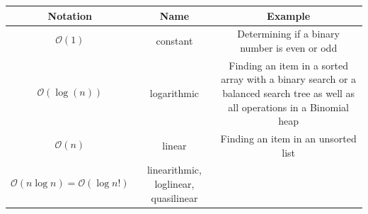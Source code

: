 \documentclass[11pt]{article}
\begin{document}
\begin{longtable}[]{@{}ccc@{}}
\toprule
\begin{minipage}[b]{0.30\columnwidth}\centering
Notation\strut
\end{minipage} & \begin{minipage}[b]{0.30\columnwidth}\centering
Name\strut
\end{minipage} & \begin{minipage}[b]{0.30\columnwidth}\centering
Example\strut
\end{minipage}\tabularnewline
\midrule
\endhead
\begin{minipage}[t]{0.30\columnwidth}\centering
\[\mathcal{O}(1)\]\strut
\end{minipage} & \begin{minipage}[t]{0.30\columnwidth}\centering
constant\strut
\end{minipage} & \begin{minipage}[t]{0.30\columnwidth}\centering
Determining if a binary number is even or odd\strut
\end{minipage}\tabularnewline
\begin{minipage}[t]{0.30\columnwidth}\centering
\[\mathcal{O}(\log(n))\]\strut
\end{minipage} & \begin{minipage}[t]{0.30\columnwidth}\centering
logarithmic\strut
\end{minipage} & \begin{minipage}[t]{0.30\columnwidth}\centering
Finding an item in a sorted array with a binary search or a balanced
search tree as well as all operations in a Binomial heap\strut
\end{minipage}\tabularnewline
\begin{minipage}[t]{0.30\columnwidth}\centering
\[\mathcal{O}( n)\]\strut
\end{minipage} & \begin{minipage}[t]{0.30\columnwidth}\centering
linear\strut
\end{minipage} & \begin{minipage}[t]{0.30\columnwidth}\centering
Finding an item in an unsorted list\strut
\end{minipage}\tabularnewline
\begin{minipage}[t]{0.30\columnwidth}\centering
\[\mathcal{O}( n\log n) =\mathcal{O}(\log n!)\]\strut
\end{minipage} & \begin{minipage}[t]{0.30\columnwidth}\centering
linearithmic, loglinear, quasilinear\strut

\end{minipage}
\end{longtable}
\end{document}
